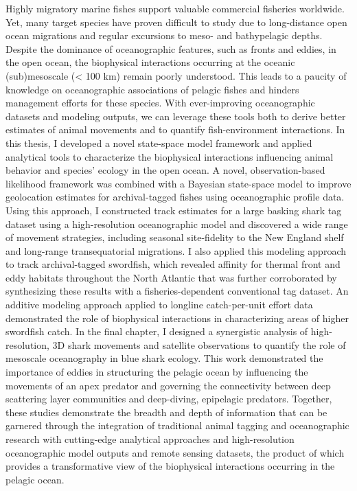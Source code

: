 Highly migratory marine fishes support valuable commercial fisheries worldwide. Yet, many target species have proven difficult to study due to long-distance open ocean migrations and regular excursions to meso- and bathypelagic depths. Despite the dominance of oceanographic features, such as fronts and eddies, in the open ocean, the biophysical interactions occurring at the oceanic (sub)mesoscale (< 100 km) remain poorly understood. This leads to a paucity of knowledge on oceanographic associations of pelagic fishes and hinders management efforts for these species. With ever-improving oceanographic datasets and modeling outputs, we can leverage these tools both to derive better estimates of animal movements and to quantify fish-environment interactions. In this thesis, I developed a novel state-space model framework and applied analytical tools to characterize the biophysical interactions influencing animal behavior and species' ecology in the open ocean. A novel, observation-based likelihood framework was combined with a Bayesian state-space model to improve geolocation estimates for archival-tagged fishes using oceanographic profile data. Using this approach, I constructed track estimates for a large basking shark tag dataset using a high-resolution oceanographic model and discovered a wide range of movement strategies, including seasonal site-fidelity to the New England shelf and long-range transequatorial migrations. I also applied this modeling approach to track archival-tagged swordfish, which revealed affinity for thermal front and eddy habitats throughout the North Atlantic that was further corroborated by synthesizing these results with a fisheries-dependent conventional tag dataset. An additive modeling approach applied to longline catch-per-unit effort data demonstrated the role of biophysical interactions in characterizing areas of higher swordfish catch. In the final chapter, I designed a synergistic analysis of high-resolution, 3D shark movements and satellite observations to quantify the role of mesoscale oceanography in blue shark ecology. This work demonstrated the importance of eddies in structuring the pelagic ocean by influencing the movements of an apex predator and governing the connectivity between deep scattering layer communities and deep-diving, epipelagic predators. Together, these studies demonstrate the breadth and depth of information that can be garnered through the integration of traditional animal tagging and oceanographic research with cutting-edge analytical approaches and high-resolution oceanographic model outputs and remote sensing datasets, the product of which provides a transformative view of the biophysical interactions occurring in the pelagic ocean.